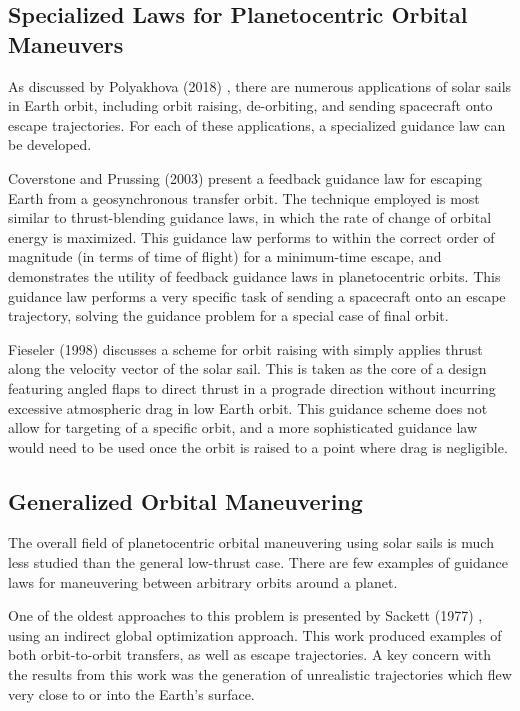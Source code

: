 \subsection{Specialized Laws for Planetocentric Orbital Maneuvers}
As discussed by Polyakhova (2018) \cite{polyakhova2018solar}, there are numerous applications of solar sails in Earth orbit, including orbit raising, de-orbiting, and sending spacecraft onto escape trajectories. For each of these applications, a specialized guidance law can be developed.

Coverstone and Prussing (2003) \cite{coverstone2003technique} present a feedback guidance law for escaping Earth from a geosynchronous transfer orbit. The technique employed is most similar to thrust-blending guidance laws, in which the rate of change of orbital energy is maximized. This guidance law performs to within the correct order of magnitude (in terms of time of flight) for a minimum-time escape, and demonstrates the utility of feedback guidance laws in planetocentric orbits. This guidance law performs a very specific task of sending a spacecraft onto an escape trajectory, solving the guidance problem for a special case of final orbit.

Fieseler (1998) \cite{fieseler1998method} discusses a scheme for orbit raising with simply applies thrust along the velocity vector of the solar sail. This is taken as the core of a design featuring angled flaps to direct thrust in a prograde direction without incurring excessive atmospheric drag in low Earth orbit. This guidance scheme does not allow for targeting of a specific orbit, and a more sophisticated guidance law would need to be used once the orbit is raised to a point where drag is negligible.

\subsection{Generalized Orbital Maneuvering}
The overall field of planetocentric orbital maneuvering using solar sails is much less studied than the general low-thrust case. There are few examples of guidance laws for maneuvering between arbitrary orbits around a planet.

One of the oldest approaches to this problem is presented by Sackett (1977) \cite{sackett1977optimal}, using an indirect global optimization approach. This work produced examples of both orbit-to-orbit transfers, as well as escape trajectories. A key concern with the results from this work was the generation of unrealistic trajectories which flew very close to or into the Earth's surface.

